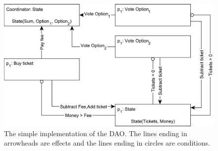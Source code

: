 \documentclass{article}
\begin{document}
	\begin{figure}[ht]
  	\includegraphics[width=\textwidth]{figures/dcr-graphs/dao-simple.pdf}
	  \caption{The simple implementation of the DAO.
	  The lines ending in arrowheads are effects and the lines ending in circles are conditions. }
	  \label{fig:dao-simple}
	\end{figure}
	\FloatBarrier
\end{document}
